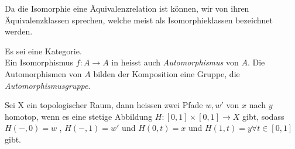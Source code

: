 \documentclass{article}
\begin{document}
		 \begin{defi}[Isomorphieklassen]
		  \cite[Definition 2.3.10]{Bra}
		 Da die Isomorphie eine \"Aquivalenzrelation ist k\"onnen, wir von ihren \"Aquivalenzklassen sprechen, welche meist als Isomorphieklassen bezeichnet werden.
		 \end{defi}
		 
		 
		\begin{defi}[Automorphismengruppen]
		\cite[Definition 2.3.13]{Bra}
		 Es sei \CatC eine Kategorie.  \\
		 Ein Isomorphismus \( f:A \to A \) in \CatC heisst auch \emph{Automorphismus} von $A$. 
		 Die Automorphismen von $A$ bilden \bzgl der Komposition eine Gruppe, die \emph{Automorphismusgruppe}.
		\end{defi}
		
		 \begin{defi}[Homotopieklasse]
		  \cite[Aufgabe 2.24]{Bra}
		 Sei X ein topologischer Raum, dann heissen zwei Pfade \( w,w'  \) von \(x \) nach \( y \) homotop, wenn es eine stetige Abbildung \( H : [0,1] \times [0,1 ] \to X \) gibt, sodass \( H(-,0) = w \) , \( H( -,1) =w' \) und \( H(0,t) =x \) und \(H(1,t) = y \forall t \in [0,1] \) gibt.
		 \end{defi}
		 
\end{document}
